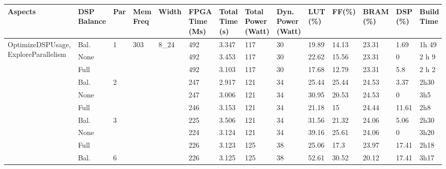 \begin{table}
  \begin{tabularx}{\textwidth}{p{3.5cm}|X|X|X|X|X|X|X|X|X|X|X|X|X|}
    Aspects & DSP Balance & Par & Mem Freq & Width & FPGA  Time (Ms) & Total Time (s) & Total Power (Watt) & Dyn. Power (Watt) & LUT (\%) & FF(\%) & BRAM (\%) & DSP (\%) & Build Time \\
    \hline \hline
    \multirow{5}{2cm}{OptimizeDSPUsage, ExploreParallelism}     & Bal.    & 1   & 303      & 8\_24 & 492             & 3.347          & 117                & 30                & 19.89    & 14.13  & 23.31     & 1.69     & 1h 49      \\
            & None        &     &          &       & 492             & 3.453          & 117                & 30                & 22.62    & 15.56  & 23.31     & 0        & 2 h 9      \\
            & Full        &     &          &       & 492             & 3.103          & 117                & 30                & 17.68    & 12.79  & 23.31     & 5.8      & 2 h 2      \\
            \hline
            & Bal.    & 2   &          &       & 247             & 2.917          &	121                & 34                & 25.44    & 25.44  & 24.53     & 3.37     & 2h30       \\
            & None        &     &          &       & 247             & 3.006          &	121                & 34                & 30.95    & 20.53  & 24.53     & 0        & 3h5        \\
            & Full        &     &          &       & 246             & 3.153          &	121                & 34                & 21.18    & 15     & 24.44     & 11.61    & 2h8        \\
            \hline
            & Bal.    & 3   &          &       & 225             & 3.506          & 121                & 34                & 31.56    & 21.32  & 24.06     & 5.06     & 2h30       \\
            & None        &     &          &       & 224             & 3.124          & 121                & 34                & 39.16    & 25.61  & 24.06     & 0        & 3h20       \\
            & Full        &     &          &       & 226             & 3.123          & 125                & 38                & 25.06    & 17.3   & 23.97     & 17.41    & 2h18       \\
            \hline
            & Bal.    & 6   &          &       & 226             & 3.125          & 125                & 38                & 52.61    & 30.52  & 20.12     & 17.41    & 3h17       \\

\end{tabularx}
\end{table}
